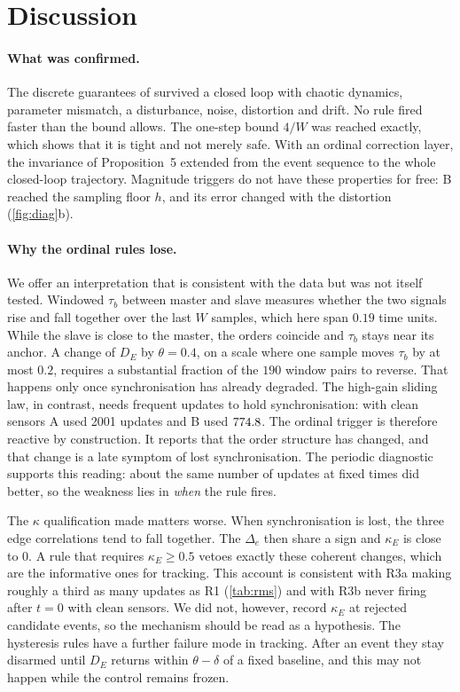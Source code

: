 \documentclass[10pt,a4paper]{article}
\newcommand{\R}[1]{\textup{R#1}}
\begin{document}
\section{Discussion}\label{sec:discussion}

\paragraph{What was confirmed.} The discrete guarantees of \citep{pv2026miet} survived a closed loop with chaotic dynamics, parameter mismatch, a disturbance, noise, distortion and drift. No rule fired faster than the bound allows. The one-step bound $4/W$ was reached exactly, which shows that it is tight and not merely safe. With an ordinal correction layer, the invariance of Proposition~5 extended from the event sequence to the whole closed-loop trajectory. Magnitude triggers do not have these properties for free: B reached the sampling floor $h$, and its error changed with the distortion (\cref{fig:diag}b).

\paragraph{Why the ordinal rules lose.} We offer an interpretation that is consistent with the data but was not itself tested. Windowed $\tau_b$ between master and slave measures whether the two signals rise and fall together over the last $W$ samples, which here span $0.19$ time units. While the slave is close to the master, the orders coincide and $\tau_b$ stays near its anchor. A change of $D_E$ by $\theta=0.4$, on a scale where one sample moves $\tau_b$ by at most $0.2$, requires a substantial fraction of the $190$ window pairs to reverse. That happens only once synchronisation has already degraded. The high-gain sliding law, in contrast, needs frequent updates to hold synchronisation: with clean sensors A used 2001 updates and B used $774.8$. The ordinal trigger is therefore reactive by construction. It reports that the order structure has changed, and that change is a late symptom of lost synchronisation. The periodic diagnostic supports this reading: about the same number of updates at fixed times did better, so the weakness lies in \emph{when} the rule fires.

The $\kappa$ qualification made matters worse. When synchronisation is lost, the three edge correlations tend to fall together. The $\Delta_e$ then share a sign and $\kappa_E$ is close to $0$. A rule that requires $\kappa_E\ge0.5$ vetoes exactly these coherent changes, which are the informative ones for tracking. This account is consistent with \R{3}a making roughly a third as many updates as \R{1} (\cref{tab:rms}) and with \R{3}b never firing after $t=0$ with clean sensors. We did not, however, record $\kappa_E$ at rejected candidate events, so the mechanism should be read as a hypothesis. The hysteresis rules have a further failure mode in tracking. After an event they stay disarmed until $D_E$ returns within $\theta-\delta$ of a fixed baseline, and this may not happen while the control remains frozen.
\end{document}
